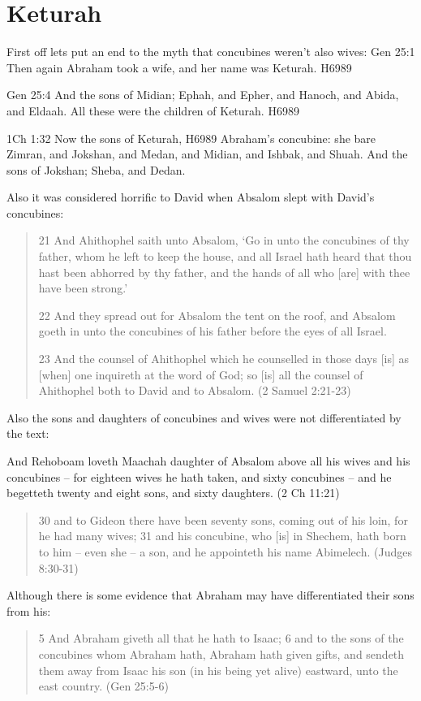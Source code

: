 \documentclass[11pt]{article}
\begin{document}
\section{Keturah}
First off lets put an end to the myth that concubines weren't also wives:
Gen 25:1
Then again Abraham took a wife, and her name was Keturah. H6989

Gen 25:4
And the sons of Midian; Ephah, and Epher, and Hanoch, and Abida, and Eldaah. All these were the children of Keturah. H6989

1Ch 1:32
Now the sons of Keturah, H6989 Abraham's concubine: she bare Zimran, and Jokshan, and Medan, and Midian, and Ishbak, and Shuah. And the sons of Jokshan; Sheba, and Dedan.

Also it was considered horrific to David when Absalom slept with David's concubines:

\begin{quote}
21 And Ahithophel saith unto Absalom, `Go in unto the concubines of thy father, whom he left to keep the house, and all Israel hath heard that thou hast been abhorred by thy father, and the hands of all who [are] with thee have been strong.'

22 And they spread out for Absalom the tent on the roof, and Absalom goeth in unto the concubines of his father before the eyes of all Israel.

23 And the counsel of Ahithophel which he counselled in those days [is] as [when] one inquireth at the word of God; so [is] all the counsel of Ahithophel both to David and to Absalom.
(2 Samuel 2:21-23)
\end{quote}

Also the sons and daughters of concubines and wives were not differentiated by the text:

And Rehoboam loveth Maachah daughter of Absalom above all his wives and his concubines -- for eighteen wives he hath taken, and sixty concubines -- and he begetteth twenty and eight sons, and sixty daughters. (2 Ch 11:21)
\begin{quote}
30 and to Gideon there have been seventy sons, coming out of his loin, for he had many wives;
31 and his concubine, who [is] in Shechem, hath born to him -- even she -- a son, and he appointeth his name Abimelech. (Judges 8:30-31)
\end{quote}

Although there is some evidence that Abraham may have differentiated their sons from his:
\begin{quote}
5 And Abraham giveth all that he hath to Isaac;
6 and to the sons of the concubines whom Abraham hath, Abraham hath given gifts, and sendeth them away from Isaac his son (in his being yet alive) eastward, unto the east country. (Gen 25:5-6)
\end{quote}
\end{document}
